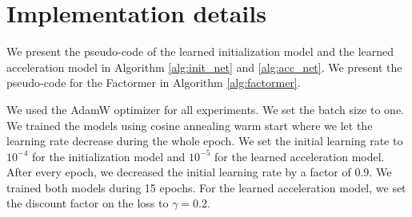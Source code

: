 \documentclass{article}
\begin{document}






\newpage
\appendix
\onecolumn
\section{Implementation details}\label{app:implementation}
We present the pseudo-code of the learned initialization model and the learned acceleration model in Algorithm \ref{alg:init_net} and \ref{alg:acc_net}. We present the pseudo-code for the Factormer in Algorithm \ref{alg:factormer}. 

We used the AdamW optimizer \cite{loshchilov2017decoupled} for all experiments. We set the batch size to one. We trained the models using cosine annealing warm start \cite{loshchilov2016sgdr} where we let the learning rate decrease during the whole epoch. We set the initial learning rate to $10^{-4}$ for the initialization model and $10^{-5}$ for the learned acceleration model. After every epoch, we decreased the initial learning rate by a factor of 0.9. We trained both models during 15 epochs. For the learned acceleration model, we set the discount factor on the loss to $\gamma = 0.2$. 
\end{document}
